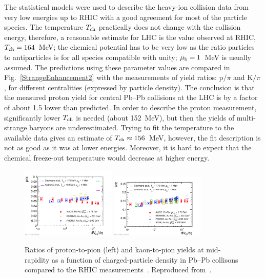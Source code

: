 The statistical models were used to describe the heavy-ion collision data from very low energies up to RHIC with a good agreement for most of the particle species. The temperature $T_{\rm ch}$ practically does not change with the collision energy, therefore, a reasonable estimate for LHC is the value observed at RHIC, $T_{\rm ch} = 164$~MeV; the chemical potential has to be very low as the ratio particles to antiparticles is for all species compatible with unity; $\mu_{\rm b} = 1$~MeV is usually assumed. The predictions using these parameter values are compared in Fig.~\ref{StrangeEnhancement2} with the measurements of yield ratios: p$/\pi$ and K$/\pi$, for different centralities (expressed by particle density). The conclusion is that the measured proton yield for central Pb--Pb collisions at the LHC is by a factor of about 1.5 lower than predicted. In order to describe the proton measurement, significantly lower $T_{\rm ch}$ is needed (about 152~MeV), but then the yields of multi-strange baryons are underestimated. Trying to fit the temperature to the available data gives an estimate of $T_{\rm ch} \approx 156$~MeV, however, the fit description is not as good as it was at lower energies. Moreover, it is hard to expect that the chemical freeze-out temperature would decrease at higher energy.

\begin{figure}
\centering
\includegraphics[width=0.4\textwidth]{ksfigures/YieldProtonToPion.pdf}
\includegraphics[width=0.4\textwidth]{ksfigures/YieldKaonToPion.pdf}
\caption{Ratios of proton-to-pion (left) and kaon-to-pion yields at mid-rapidity as a function of charged-particle density in Pb--Pb collisons compared to the RHIC measurements~\cite{Abelev:2008ab,Bearden:2001qq,Adler:2003cb}. Reproduced from~\cite{Abelev:2013vea}.}
\label{figks:StrangeEnhancement2}
\end{figure}



